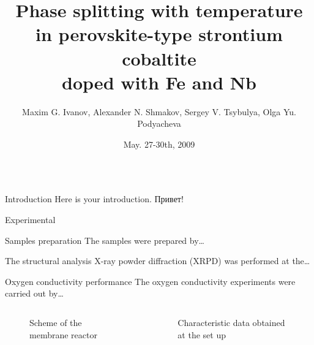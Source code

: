 \documentclass[final]{beamer}
\title{\Huge Phase splitting with temperature in perovskite-type
	strontium cobaltite \\doped with Fe and Nb}
\author{Maxim G. Ivanov\inst{1}, Alexander N. Shmakov\inst{1,2},
	Sergey V. Tsybulya\inst{1,2}, Olga Yu. Podyacheva\inst{1}}
\institute[] %
{
	\inst{1}%
	Boreskov Institute of Catalysis SB RAS, Russia
	\\
	\inst{2}%
	Novosibirsk State University, Russia
}
\date[May. 27-30th, 2009]{May. 27-30th, 2009}
\begin{document}
	\begin{frame}{}
	\vspace{-1cm}
	\begin{columns}[t]  %
		\begin{column}{.39\linewidth}  %
			
			\begin{block}{Introduction}
				Here is your introduction. Привет!
			\end{block}
			
			\vspace{2.5cm}  %
			
			\begin{block}{Experimental}
				\begin{exampleblock}{Samples preparation}
					The samples were prepared by\ldots
				\end{exampleblock}
				
				\begin{exampleblock}{The structural analysis}
					X-ray powder diffraction (XRPD) was performed at the\ldots
				\end{exampleblock}
				
				\begin{exampleblock}{Oxygen conductivity performance}
					The oxygen conductivity experiments were carried out by\ldots
				\end{exampleblock}
				
				\begin{columns}
					\begin{figure}[h]
						\centering
						\caption{Scheme of the membrane reactor}
						\label{fig:membrane}
					\end{figure}
					
					\begin{figure}[h]
						\centering
						\caption{Characteristic data obtained
							at the set up}
						\label{fig:oxygen-conductivity}
					\end{figure}
				\end{columns}
				

\end{block}
\end{column}
\end{columns}
\end{frame}
\end{document}
